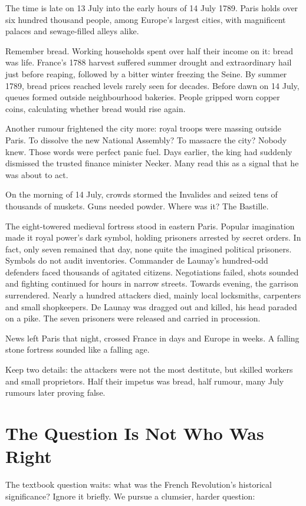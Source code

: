 The time is late on 13 July into the early hours of 14 July 1789. Paris holds over six hundred thousand people, among Europe's largest cities, with magnificent palaces and sewage-filled alleys alike.

Remember bread. Working households spent over half their income on it: bread was life. France's 1788 harvest suffered summer drought and extraordinary hail just before reaping, followed by a bitter winter freezing the Seine. By summer 1789, bread prices reached levels rarely seen for decades. Before dawn on 14 July, queues formed outside neighbourhood bakeries. People gripped worn copper coins, calculating whether bread would rise again.

Another rumour frightened the city more: royal troops were massing outside Paris. To dissolve the new National Assembly? To massacre the city? Nobody knew. Those words were perfect panic fuel. Days earlier, the king had suddenly dismissed the trusted finance minister Necker. Many read this as a signal that he was about to act.

On the morning of 14 July, crowds stormed the Invalides and seized tens of thousands of muskets. Guns needed powder. Where was it? The Bastille.

The eight-towered medieval fortress stood in eastern Paris. Popular imagination made it royal power's dark symbol, holding prisoners arrested by secret orders. In fact, only seven remained that day, none quite the imagined political prisoners. Symbols do not audit inventories. Commander de Launay's hundred-odd defenders faced thousands of agitated citizens. Negotiations failed, shots sounded and fighting continued for hours in narrow streets. Towards evening, the garrison surrendered. Nearly a hundred attackers died, mainly local locksmiths, carpenters and small shopkeepers. De Launay was dragged out and killed, his head paraded on a pike. The seven prisoners were released and carried in procession.

News left Paris that night, crossed France in days and Europe in weeks. A falling stone fortress sounded like a falling age.

Keep two details: the attackers were not the most destitute, but skilled workers and small proprietors. Half their impetus was bread, half rumour, many July rumours later proving false.

\section{The Question Is Not Who Was Right}
The textbook question waits: what was the French Revolution's historical significance? Ignore it briefly. We pursue a clumsier, harder question:

